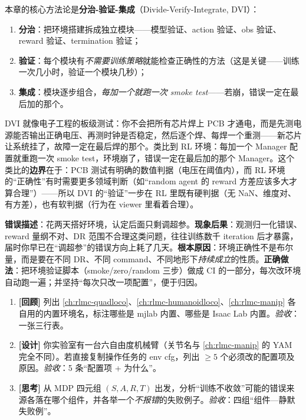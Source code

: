 本章的核心方法论是\textbf{分治-验证-集成}（Divide-Verify-Integrate, DVI）：

\begin{enumerate}
\item \textbf{分治}：把环境搭建拆成独立模块——模型验证、action 验证、obs 验证、reward 验证、termination 验证；
\item \textbf{验证}：每个模块有\emph{不需要训练策略}就能检查正确性的方法（这是关键——训练一次几小时，验证一个模块几秒）；
\item \textbf{集成}：模块逐步组合，\emph{每加一个就跑一次 smoke test}——若崩，错误一定在最后加的那个。
\end{enumerate}

\begin{insight}\label{ins:rlmc-diy-pcb}
DVI 就像电子工程的板级测试：你不会把所有芯片焊上 PCB 才通电，而是先测电源能否输出正确电压、再测时钟是否稳定，然后逐个焊、每焊一个重测——新芯片让系统挂了，故障一定在最后焊的那个。类比到 RL 环境：每加一个 Manager 配置就重跑一次 smoke test，环境崩了，错误一定在最后加的那个 Manager。这个类比的\textbf{边界}在于：PCB 测试有明确的数值判据（电压在阈值内），而 RL 环境的“正确性”有时需要更多领域判断（如“random agent 的 reward 方差应该多大才算合理”）——所以 DVI 的“验证”一步在 RL 里既有硬判据（无 NaN、维度对、有方差），也有软判据（行为在 viewer 里看着合理）。
\end{insight}

\begin{pitfall}
\textbf{错误描述}：花两天搭好环境，认定后面只剩调超参。\textbf{现象后果}：观测归一化错误、reward 量纲不对、DR 范围不合理这类问题，往往训练数千 iteration 后才暴露，届时你早已在“调超参”的错误方向上耗了几天。\textbf{根本原因}：环境正确性不是布尔量，而是要在不同 DR、不同 command、不同地形下\emph{持续成立}的性质。\textbf{正确做法}：把环境验证脚本（smoke/zero/random 三步）做成 CI 的一部分，每次改环境自动跑一遍；并坚持“每次只改一项配置”，便于归因。
\end{pitfall}

\begin{practice}[DVI 热身]
\begin{enumerate}
\item \textbf{[回顾]} 列出 \cref{ch:rlmc-quadloco}、\cref{ch:rlmc-humanoidloco}、\cref{ch:rlmc-manip} 各自用的内置环境名，标注哪些是 mjlab 内置、哪些是 Isaac Lab 内置。\emph{验收}：一张三行表。
\item \textbf{[设计]} 你实验室有一台六自由度机械臂（关节名与 \cref{ch:rlmc-manip} 的 YAM 完全不同）。若直接复制操作任务的 env cfg，列出 $\ge 5$ 个必须改的配置项及原因。\emph{验收}：5 条“配置项 + 为什么”。
\item \textbf{[思考]} 从 MDP 四元组 $(S,A,R,T)$ 出发，分析“训练不收敛”可能的错误来源各落在哪个组件，并各举一个\emph{不报错}的失败例子。\emph{验收}：四组“组件—静默失败例”。
\end{enumerate}
\end{practice}

